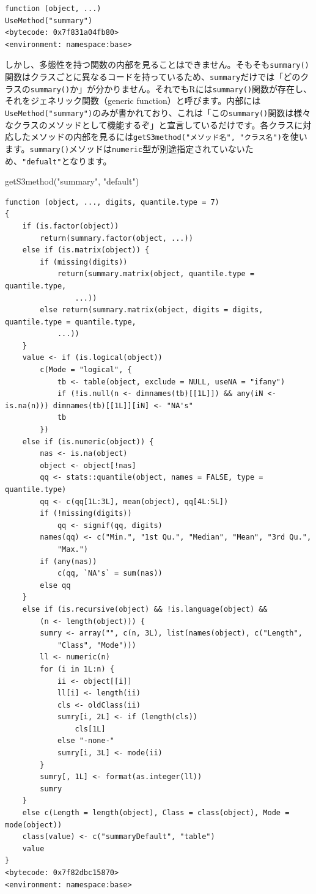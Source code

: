 \documentclass[
  a4paper,
  pandoc,
  ja=standard,
  jafont=haranoaji]{bxjsbook}
\newenvironment{Shaded}{\begin{snugshade}}{\end{snugshade}}
\newcommand{\FunctionTok}[1]{\textcolor[rgb]{0.28,0.35,0.67}{#1}}
\newcommand{\NormalTok}[1]{\textcolor[rgb]{0.00,0.48,0.65}{#1}}
\newcommand{\StringTok}[1]{\textcolor[rgb]{0.13,0.47,0.30}{#1}}
\begin{document}
\begin{verbatim}
function (object, ...) 
UseMethod("summary")
<bytecode: 0x7f831a04fb80>
<environment: namespace:base>
\end{verbatim}

しかし、多態性を持つ関数の内部を見ることはできません。そもそも\texttt{summary()}関数はクラスごとに異なるコードを持っているため、\texttt{summary}だけでは「どのクラスの\texttt{summary()}か」が分かりません。それでもRには\texttt{summary()}関数が存在し、それをジェネリック関数（generic
function）と呼びます。内部には\texttt{UseMethod("summary")}のみが書かれており、これは「この\texttt{summary()}関数は様々なクラスのメソッドとして機能するぞ」と宣言しているだけです。各クラスに対応したメソッドの内部を見るには\texttt{getS3method("メソッド名",\ "クラス名")}を使います。\texttt{summary()}メソッドは\texttt{numeric}型が別途指定されていないため、\texttt{"defualt"}となります。

\begin{Shaded}
\begin{Highlighting}[numbers=left,,]
\FunctionTok{getS3method}\NormalTok{(}\StringTok{"summary"}\NormalTok{, }\StringTok{"default"}\NormalTok{)}
\end{Highlighting}
\end{Shaded}

\begin{verbatim}
function (object, ..., digits, quantile.type = 7) 
{
    if (is.factor(object)) 
        return(summary.factor(object, ...))
    else if (is.matrix(object)) {
        if (missing(digits)) 
            return(summary.matrix(object, quantile.type = quantile.type, 
                ...))
        else return(summary.matrix(object, digits = digits, quantile.type = quantile.type, 
            ...))
    }
    value <- if (is.logical(object)) 
        c(Mode = "logical", {
            tb <- table(object, exclude = NULL, useNA = "ifany")
            if (!is.null(n <- dimnames(tb)[[1L]]) && any(iN <- is.na(n))) dimnames(tb)[[1L]][iN] <- "NA's"
            tb
        })
    else if (is.numeric(object)) {
        nas <- is.na(object)
        object <- object[!nas]
        qq <- stats::quantile(object, names = FALSE, type = quantile.type)
        qq <- c(qq[1L:3L], mean(object), qq[4L:5L])
        if (!missing(digits)) 
            qq <- signif(qq, digits)
        names(qq) <- c("Min.", "1st Qu.", "Median", "Mean", "3rd Qu.", 
            "Max.")
        if (any(nas)) 
            c(qq, `NA's` = sum(nas))
        else qq
    }
    else if (is.recursive(object) && !is.language(object) && 
        (n <- length(object))) {
        sumry <- array("", c(n, 3L), list(names(object), c("Length", 
            "Class", "Mode")))
        ll <- numeric(n)
        for (i in 1L:n) {
            ii <- object[[i]]
            ll[i] <- length(ii)
            cls <- oldClass(ii)
            sumry[i, 2L] <- if (length(cls)) 
                cls[1L]
            else "-none-"
            sumry[i, 3L] <- mode(ii)
        }
        sumry[, 1L] <- format(as.integer(ll))
        sumry
    }
    else c(Length = length(object), Class = class(object), Mode = mode(object))
    class(value) <- c("summaryDefault", "table")
    value
}
<bytecode: 0x7f82dbc15870>
<environment: namespace:base>
\end{verbatim}
\end{document}
